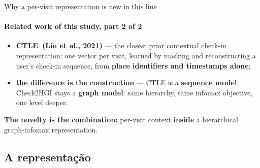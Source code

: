 \documentclass{beamer}
\begin{document}
\begin{frame}{Why a per-visit representation is new in this line}
    \framesubtitle{Related work of this study, part 2 of 2}

    \begin{itemize}\setlength{\itemsep}{5pt}
        \item \textbf{CTLE~{\scriptsize(Lin et al., 2021)}} --- the closest prior contextual check-in representation: one vector
              per visit, learned by masking and reconstructing a user's check-in sequence, from
              \textbf{place identifiers and timestamps alone};
        \item \textbf{the difference is the construction} --- CTLE is a \textbf{sequence model};
              Check2HGI stays a \textbf{graph model}: same hierarchy, same infomax objective,
              \alert{one level deeper}.
    \end{itemize}

    \bigskip
    \begin{block}{}
        \centering
        \alert{\textbf{The novelty is the combination:}} per-visit context \textbf{inside} a
        hierarchical graph-infomax representation.
    \end{block}
\end{frame}

\subsection{A representação}
\end{document}
